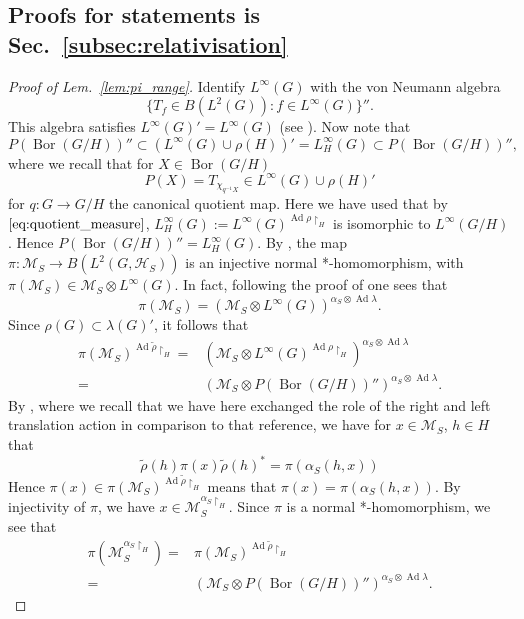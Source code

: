 \documentclass[sn-mathphys-num]{sn-jnl}%
\newcommand{\HH}{\mathcal{H}}
\newcommand{\MM}{\mathcal{M}}
\DeclareMathOperator{\Bor}{Bor}
\DeclareMathOperator{\Ad}{Ad}
\numberwithin{equation}{section}
\theoremstyle{thmstyleone}%
\theoremstyle{thmstyletwo}%
\theoremstyle{thmstylethree}%
\begin{document}
\subsection{Proofs for statements is Sec.\ \ref{subsec:relativisation}}
\label{appx:relativisation_proofs}
\begin{proof}[Proof of Lem.\ \ref{lem:pi_range}]
        Identify $L^\infty(G)$ with the von Neumann algebra \begin{equation}
            \{T_f\in B(L^2(G)):f\in L^\infty(G)\}''.
        \end{equation} This algebra satisfies $L^\infty(G)'=L^\infty(G)$ (see \cite[Thm.~I.7.3.2]{dixmier1981VonNeumann}). Now note that
        \begin{equation}
            P(\Bor(G/H))''\subset (L^\infty (G)\cup \rho(H))'= L_H^\infty(G)\subset P(\Bor(G/H))'',
        \end{equation} where we recall that for $X\in\Bor(G/H)$
        \begin{equation}
            P(X)=T_{\chi_{q^{-1}X}}\in L^\infty (G)\cup \rho(H)'
        \end{equation} for $q:G\to G/H$ the canonical quotient map. Here we have used that by $\eqref{eq:quotient_measure}$, $L_H^\infty(G):=L^\infty(G)^{\Ad \rho\restriction_{H}}$ is isomorphic to $L^\infty(G/H)$.
        Hence $P(\Bor(G/H))''=L_H^\infty(G)$. By \cite[Part I, Prop.\ 2.5]{vanDaele:1978}, the map $\pi:\MM_S\to B(L^2(G,\HH_S))$ is an injective normal *-homomorphism, with $\pi(\MM_S)\in \MM_S\otimes  L^\infty(G)$. In fact, following the proof of \cite[Part I, Thm.\ 3.11]{vanDaele:1978} one sees that 
        \begin{equation}
            \pi(\MM_S)= (\MM_S\otimes L^\infty(G))^{\alpha_S\otimes\Ad \lambda}.
        \end{equation}
        Since $\rho(G)\subset \lambda(G)'$, it follows that
        \begin{align}
            \pi(\MM_S)^{\Ad \tilde\rho\restriction_H} =& (\MM_S\otimes L^\infty(G)^{\Ad\rho\restriction_H})^{\alpha_S\otimes\Ad\lambda}\nonumber\\
            =&(\MM_S\otimes P(\Bor(G/H))'')^{\alpha_S\otimes\Ad\lambda}.
        \end{align}
        By \cite[Lem.~I.2.9]{vanDaele:1978}, where we recall that we have here exchanged the role of the right and left translation action in comparison to that reference, we have for $x\in \MM_S$, $h\in H$ that
        \begin{equation}
            \tilde{\rho}(h)\pi(x)\tilde{\rho}(h)^*=\pi(\alpha_S(h,x))
        \end{equation}
        Hence $\pi(x)\in\pi(\MM_S)^{\Ad \tilde\rho\restriction_H}$ means that $\pi(x)=\pi(\alpha_S(h,x))$. By injectivity of $\pi$, we have $x\in \MM_S^{\alpha_S\restriction_H}$. Since $\pi$ is a normal *-homomorphism, we see that
        \begin{align}
            \pi(\MM_S^{\alpha_S\restriction_H})=& \pi(\MM_S)^{\Ad \tilde\rho\restriction_H}\nonumber\\
            =&(\MM_S\otimes P(\Bor(G/H))'')^{\alpha_S\otimes\Ad \lambda}.
        \end{align}
    \end{proof}
\end{document}
